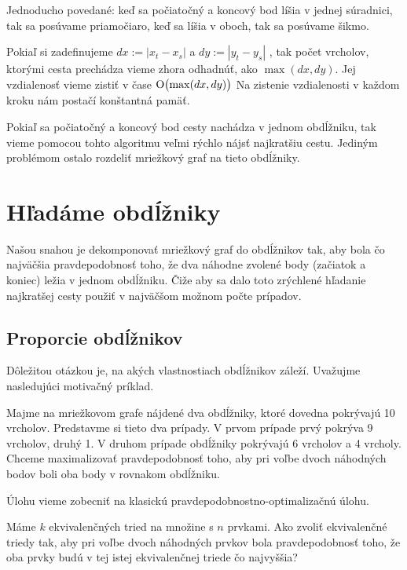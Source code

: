Jednoducho povedané: keď sa počiatočný a koncový bod líšia v jednej súradnici, tak sa posúvame priamočiaro,
keď sa líšia v oboch, tak sa posúvame šikmo.


Pokiaľ si zadefinujeme 
$ dx := |x_t - x_s|$ 
a
$ dy :=|y_t - y_s| $
 , tak počet vrcholov,
ktorými cesta prechádza vieme zhora odhadnúť, ako $\max(dx, dy)$. Jej vzdialenosť vieme zistiť v čase  $\operatorname{O}\bigl(\max(dx, dy)\bigr)$
Na zistenie vzdialenosti v každom kroku nám postačí konštantná pamäť.


Pokiaľ sa počiatočný a koncový bod cesty nachádza v jednom obdĺžniku, tak vieme pomocou tohto algoritmu veľmi rýchlo nájsť najkratšiu cestu.
Jediným problémom ostalo rozdeliť mriežkový graf na tieto obdĺžniky. 


\section{Hľadáme obdĺžniky}
Našou snahou je dekomponovať mriežkový graf do obdĺžnikov tak, aby bola čo najväčšia pravdepodobnosť toho, že 
dva náhodne zvolené body (začiatok a koniec) ležia v jednom obdĺžniku. Čiže aby sa dalo toto zrýchlené
hľadanie najkratšej cesty použiť v najväčšom možnom počte prípadov.


\subsection{Proporcie obdĺžnikov}

Dôležitou otázkou je, na akých vlastnostiach obdĺžnikov záleží. Uvažujme nasledujúci motivačný príklad.
\begin{example}
Majme na mriežkovom grafe nájdené dva obdĺžniky, ktoré dovedna pokrývajú 10 vrcholov.
Predstavme si tieto dva prípady. V prvom prípade prvý pokrýva 9 vrcholov, druhý 1. V druhom prípade obdĺžniky pokrývajú 6 vrcholov a 4 vrcholy.
Chceme maximalizovať pravdepodobnosť toho, aby pri voľbe dvoch náhodných bodov boli oba body v rovnakom obdĺžniku.
\end{example}

Úlohu vieme zobecniť na klasickú pravdepodobnostno-optimalizačnú úlohu.

\begin{example}
Máme $k$ ekvivalenčných tried na množine s $n$ prvkami. Ako zvoliť ekvivalenčné triedy tak, 
aby pri voľbe dvoch náhodných prvkov bola pravdepodobnosť toho, 
že oba prvky budú v tej istej ekvivalenčnej triede čo najvyššia?
\end{example}

